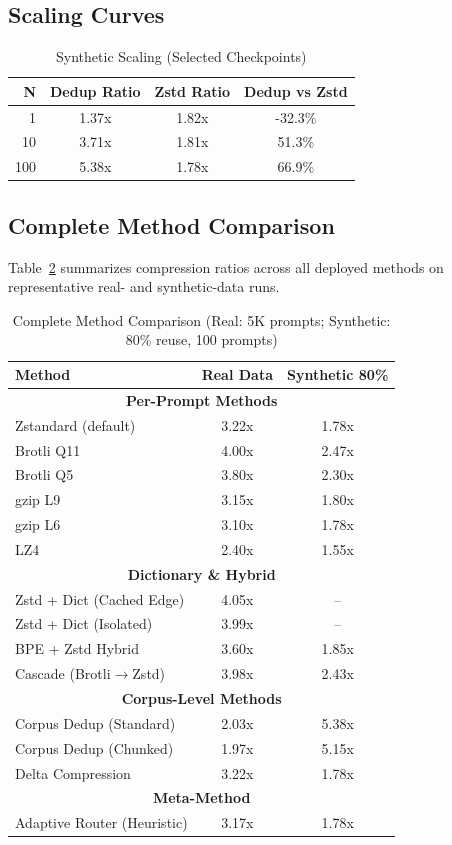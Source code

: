 \documentclass[10pt,conference]{IEEEtran}
\begin{document}
\subsection{Scaling Curves}
\begin{table}[h]
\centering
\renewcommand{\arraystretch}{1.2}
\begin{tabular}{|r|c|c|c|}
\hline
\textbf{N} & \textbf{Dedup Ratio} & \textbf{Zstd Ratio} & \textbf{Dedup vs Zstd} \\
\hline
1 & 1.37x & 1.82x & -32.3\% \\
10 & 3.71x & 1.81x & 51.3\% \\
100 & 5.38x & 1.78x & 66.9\% \\
\hline
\end{tabular}
\caption{Synthetic Scaling (Selected Checkpoints)}
\label{tab:synthetic_scaling}
\end{table}

\subsection{Complete Method Comparison}
Table~\ref{tab:complete_methods} summarizes compression ratios across all deployed methods on representative real- and synthetic-data runs.

\begin{table}[h]
\centering
\renewcommand{\arraystretch}{1.1}
\begin{tabular}{|l|c|c|}
\hline
\textbf{Method} & \textbf{Real Data} & \textbf{Synthetic 80\%} \\
\hline
\multicolumn{3}{|c|}{\textbf{Per-Prompt Methods}} \\
\hline
Zstandard (default) & 3.22x & 1.78x \\
Brotli Q11 & 4.00x & 2.47x \\
Brotli Q5 & 3.80x & 2.30x \\
gzip L9 & 3.15x & 1.80x \\
gzip L6 & 3.10x & 1.78x \\
LZ4 & 2.40x & 1.55x \\
\hline
\multicolumn{3}{|c|}{\textbf{Dictionary \& Hybrid}} \\
\hline
Zstd + Dict (Cached Edge) & 4.05x & -- \\
Zstd + Dict (Isolated) & 3.99x & -- \\
BPE + Zstd Hybrid & 3.60x & 1.85x \\
Cascade (Brotli$\rightarrow$Zstd) & 3.98x & 2.43x \\
\hline
\multicolumn{3}{|c|}{\textbf{Corpus-Level Methods}} \\
\hline
Corpus Dedup (Standard) & 2.03x & 5.38x \\
Corpus Dedup (Chunked) & 1.97x & 5.15x \\
Delta Compression & 3.22x & 1.78x \\
\hline
\multicolumn{3}{|c|}{\textbf{Meta-Method}} \\
\hline
Adaptive Router (Heuristic) & 3.17x & 1.78x \\
\hline
\end{tabular}
\caption{Complete Method Comparison (Real: 5K prompts; Synthetic: 80\% reuse, 100 prompts)}
\label{tab:complete_methods}
\end{table}
\end{document}
